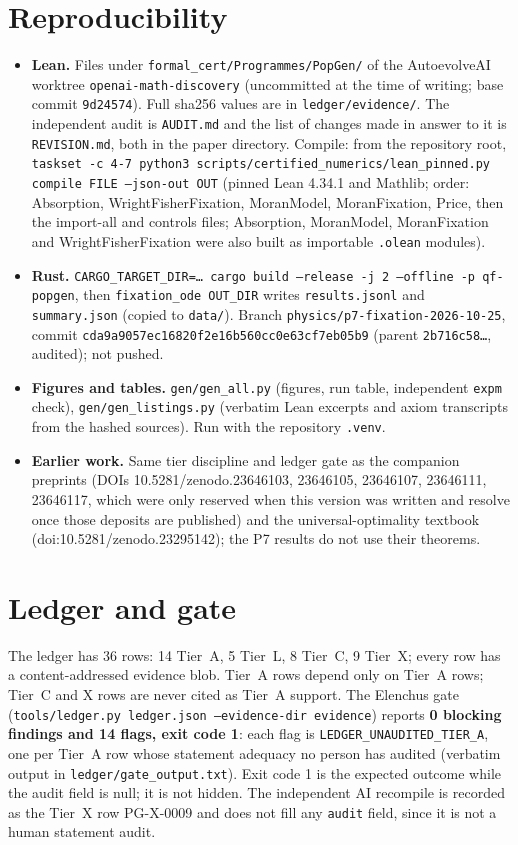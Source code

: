 \documentclass[11pt]{article}
\theoremstyle{remark}
\begin{document}
\section{Reproducibility}\label{sec:repro}
\begin{itemize}\setlength\itemsep{1pt}
\item \textbf{Lean.} Files under \texttt{formal\_cert/Programmes/PopGen/} of the AutoevolveAI worktree \texttt{openai-math-discovery} (uncommitted at the time of writing; base commit
 \texttt{9d24574}). Full sha256 values are in \texttt{ledger/evidence/}. The independent audit is \texttt{AUDIT.md} and the list of changes made in answer to it is \texttt{REVISION.md}, both in the paper directory. Compile: from the repository root,
 \texttt{taskset -c 4-7 python3 scripts/certified\_numerics/lean\_pinned.py compile FILE --json-out OUT} (pinned Lean 4.34.1 and Mathlib; order: Absorption, WrightFisherFixation,
 MoranModel, MoranFixation, Price, then the import-all and controls files; Absorption, MoranModel, MoranFixation and WrightFisherFixation were also built as importable \texttt{.olean} modules).
\item \textbf{Rust.} \texttt{CARGO\_TARGET\_DIR=\dots{} cargo build --release -j 2 --offline -p qf-popgen}, then \texttt{fixation\_ode OUT\_DIR} writes \texttt{results.jsonl}
 and \texttt{summary.json} (copied to \texttt{data/}). Branch \texttt{physics/p7-fixation-2026-10-25}, commit \texttt{cda9a9057ec16820f2e16b560cc0e63cf7eb05b9} (parent \texttt{2b716c58\dots}, audited); not pushed.
\item \textbf{Figures and tables.} \texttt{gen/gen\_all.py} (figures, run table, independent \texttt{expm} check), \texttt{gen/gen\_listings.py} (verbatim Lean excerpts and axiom
 transcripts from the hashed sources). Run with the repository \texttt{.venv}.
\item \textbf{Earlier work.} Same tier discipline and ledger gate as the companion preprints (DOIs 10.5281/zenodo.23646103, 23646105, 23646107, 23646111, 23646117, which were only reserved when this version was written and resolve once those deposits are published) and the universal-optimality
 textbook (doi:10.5281/zenodo.23295142); the P7 results do not use their theorems.
\end{itemize}

\section{Ledger and gate}\label{sec:ledger}
The ledger has 36 rows: 14 Tier~A, 5 Tier~L, 8 Tier~C, 9 Tier~X; every row has a content-addressed evidence blob. Tier~A rows depend only on Tier~A rows; Tier~C and X rows are never cited as Tier~A support.
The Elenchus gate (\texttt{tools/ledger.py ledger.json --evidence-dir evidence}) reports \textbf{0 blocking findings and 14 flags, exit code 1}: each flag is
\texttt{LEDGER\_UNAUDITED\_TIER\_A}, one per Tier~A row whose statement adequacy no person has audited (verbatim output in \texttt{ledger/gate\_output.txt}). Exit code 1 is the expected outcome while the audit field is null; it is not hidden. The independent AI recompile is recorded as the Tier~X row PG-X-0009 and does not fill any \texttt{audit} field, since it is not a human statement audit.
\end{document}

